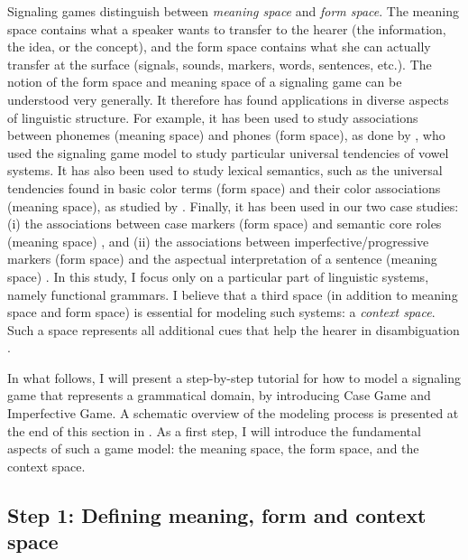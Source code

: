 \documentclass[output=paper,hidelinks]{langscibook}
\begin{document}
Signaling games distinguish between \emph{meaning space} and \emph{form space}. The meaning space contains what a speaker wants to transfer to the hearer (the information, the idea, or the concept), and the form space contains what she can actually transfer at the surface (signals, sounds, markers, words, sentences, etc.). 
The notion of the form space and meaning space of a signaling game can be understood very generally. It therefore has found applications in diverse aspects of linguistic structure. For example, it has been used to study associations between phonemes (meaning space) and phones (form space), as done by \citet{jaeger_2008b}, who used the signaling game model to study particular universal tendencies of vowel systems.
It has also been used to study lexical semantics, such as the universal tendencies found in basic color terms (form space) and their color associations (meaning space), as studied by \citet{jaeger_2006}. 
Finally, it has been used in our two case studies: 
(i) the associations between case markers (form space) and semantic core roles (meaning space) \citep{Jaeger07}, and (ii) the associations between imperfective/progressive markers (form space) and the aspectual interpretation of a sentence (meaning space) \citep{Deo_2015}. 
In this study, I focus only on a particular part of linguistic systems, namely functional grammars. 
I  believe that a third space (in addition to meaning space and form space) is essential for modeling such systems: a \emph{context space}. Such a space represents all additional cues that help the hearer in disambiguation
\citep[cf.][]{vanRooij_2004}.

In what follows, I will present a step-by-step tutorial for how to model a signaling game that represents a grammatical domain, by introducing  Case Game and  Imperfective Game. A sche\-ma\-tic over\-view of the modeling process is presented at the end of this section in .  As a first step, I will introduce the fundamental aspects of such a game model: the meaning space, the form space, and the context space.

\subsection{Step 1: Defining meaning, form and context space}
\label{sec:step1}
\end{document}
